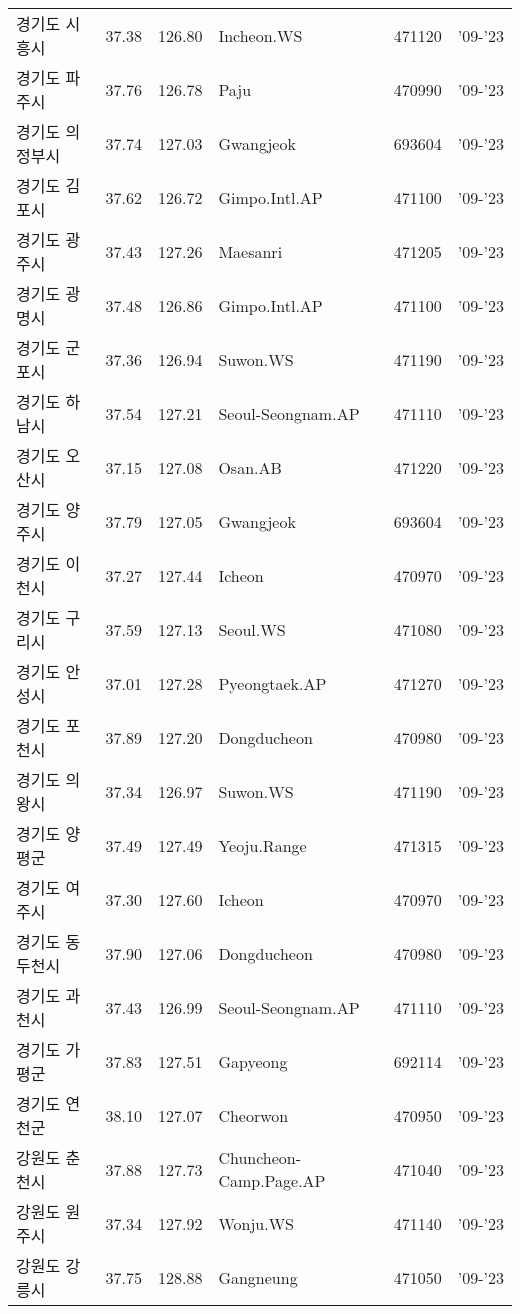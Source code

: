 \begin{longtable}{lcclcc}
  경기도 시흥시 & 37.38 & 126.80 & Incheon.WS & 471120 & '09-'23 \\
  경기도 파주시 & 37.76 & 126.78 & Paju & 470990 & '09-'23 \\
  경기도 의정부시 & 37.74 & 127.03 & Gwangjeok & 693604 & '09-'23 \\
  경기도 김포시 & 37.62 & 126.72 & Gimpo.Intl.AP & 471100 & '09-'23 \\
  경기도 광주시 & 37.43 & 127.26 & Maesanri & 471205 & '09-'23 \\
  경기도 광명시 & 37.48 & 126.86 & Gimpo.Intl.AP & 471100 & '09-'23 \\
  경기도 군포시 & 37.36 & 126.94 & Suwon.WS & 471190 & '09-'23 \\
  경기도 하남시 & 37.54 & 127.21 & Seoul-Seongnam.AP & 471110 & '09-'23 \\
  경기도 오산시 & 37.15 & 127.08 & Osan.AB & 471220 & '09-'23 \\
  경기도 양주시 & 37.79 & 127.05 & Gwangjeok & 693604 & '09-'23 \\
  경기도 이천시 & 37.27 & 127.44 & Icheon & 470970 & '09-'23 \\
  경기도 구리시 & 37.59 & 127.13 & Seoul.WS & 471080 & '09-'23 \\
  경기도 안성시 & 37.01 & 127.28 & Pyeongtaek.AP & 471270 & '09-'23 \\
  경기도 포천시 & 37.89 & 127.20 & Dongducheon & 470980 & '09-'23 \\
  경기도 의왕시 & 37.34 & 126.97 & Suwon.WS & 471190 & '09-'23 \\
  경기도 양평군 & 37.49 & 127.49 & Yeoju.Range & 471315 & '09-'23 \\
  경기도 여주시 & 37.30 & 127.60 & Icheon & 470970 & '09-'23 \\
  경기도 동두천시 & 37.90 & 127.06 & Dongducheon & 470980 & '09-'23 \\
  경기도 과천시 & 37.43 & 126.99 & Seoul-Seongnam.AP & 471110 & '09-'23 \\
  경기도 가평군 & 37.83 & 127.51 & Gapyeong & 692114 & '09-'23 \\
  경기도 연천군 & 38.10 & 127.07 & Cheorwon & 470950 & '09-'23 \\
  강원도 춘천시 & 37.88 & 127.73 & Chuncheon-Camp.Page.AP & 471040 & '09-'23 \\
  강원도 원주시 & 37.34 & 127.92 & Wonju.WS & 471140 & '09-'23 \\
  강원도 강릉시 & 37.75 & 128.88 & Gangneung & 471050 & '09-'23 \\

\end{longtable}

